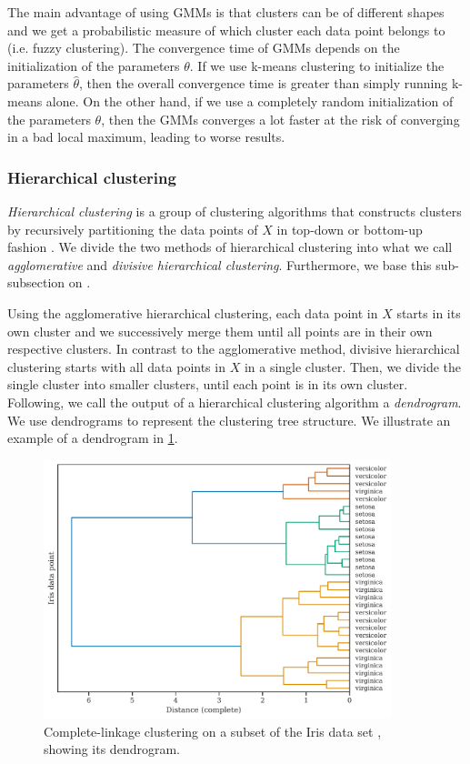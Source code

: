 The main advantage of using GMMs is that clusters can be of different shapes and we get a probabilistic measure of which cluster each data point belongs to (i.e. fuzzy clustering). The convergence time of GMMs depends on the initialization of the parameters $\theta$. If we use k-means clustering to initialize the parameters $\hat{\theta}$, then the overall convergence time is greater than simply running k-means alone. On the other hand, if we use a completely random initialization of the parameters $\theta$, then the GMMs converges a lot faster at the risk of converging in a bad local maximum, leading to worse results.

\subsubsection{Hierarchical clustering}
\label{sec:hierarchical-clustering}
\textit{Hierarchical clustering} is a group of clustering algorithms that constructs clusters by recursively partitioning the data points of $X$ in top-down or bottom-up fashion \cite{Rokach2005}. We divide the two methods of hierarchical clustering into what we call \textit{agglomerative} and \textit{divisive hierarchical clustering}. Furthermore, we base this sub-subsection on \cite{Rokach2005}.

Using the agglomerative hierarchical clustering, each data point in $X$ starts in its own cluster and we successively merge them until all points are in their own respective clusters. In contrast to the agglomerative method, divisive hierarchical clustering starts with all data points in $X$ in a single cluster. Then, we divide the single cluster into smaller clusters, until each point is in its own cluster. Following, we call the output of a hierarchical clustering algorithm a \textit{dendrogram}. We use dendrograms to represent the clustering tree structure. We illustrate an example of a dendrogram in \cref{fig:dendrogram-example}.
\begin{figure}[H]
    \centering
    \includegraphics[width=0.9\textwidth]{thesis/figures/dendrogram-example.pdf}
    \caption{Complete-linkage clustering on a subset of the Iris data set \cite{Anderson1936,Fisher1936}, showing its dendrogram.}
    \label{fig:dendrogram-example}
\end{figure}

